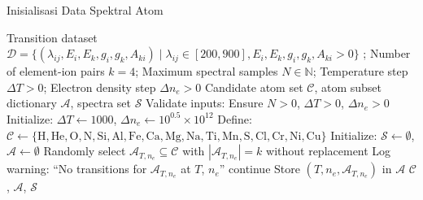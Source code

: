 

\label{app:algo1}
\begin{algoritma}[H]
\small
\caption{Inisialisasi Data Spektral Atom}
\begin{algorithmic}[1]
  \REQUIRE Transition dataset $\mathcal{D} = \{ (\lambda_{ij}, E_i, E_k, g_i, g_k, A_{ki}) \mid \lambda_{ij} \in [200, 900], E_i, E_k, g_i, g_k, A_{ki} > 0 \}$ ; Number of element-ion pairs $k = 4$; Maximum spectral samples $N \in \mathbb{N}$; Temperature step $\Delta T > 0$; Electron density step $\Delta n_e > 0$
  \ENSURE Candidate atom set $\mathcal{C}$, atom subset dictionary $\mathcal{A}$, spectra set $\mathcal{S}$
  \STATE Validate inputs: Ensure $N > 0$, $\Delta T > 0$, $\Delta n_e > 0$
  \STATE Initialize: $\Delta T \gets 1000$, $\Delta n_e \gets 10^{0.5} \times 10^{12}$
  \STATE Define: $\mathcal{C} \gets \{\text{H}, \text{He}, \text{O}, \text{N}, \text{Si}, \text{Al}, \text{Fe}, \text{Ca}, \text{Mg}, \text{Na}, \text{Ti}, \text{Mn}, \text{S}, \text{Cl}, \text{Cr}, \text{Ni}, \text{Cu}\}$
  \STATE Initialize: $\mathcal{S} \gets \emptyset$, $\mathcal{A} \gets \emptyset$
      \STATE Randomly select $\mathcal{A}_{T,n_e} \subseteq \mathcal{C}$ with $|\mathcal{A}_{T,n_e}| = k$ without replacement
        \STATE Log warning: ``No transitions for $\mathcal{A}_{T,n_e}$ at $T$, $n_e$'' 
        \STATE continue
      \ENDIF
      \STATE Store $(T, n_e, \mathcal{A}_{T,n_e})$ in $\mathcal{A}$
    \ENDFOR
  \ENDFOR
  \RETURN $\mathcal{C}$, $\mathcal{A}$, $\mathcal{S}$
\end{algorithmic}
\end{algoritma}

